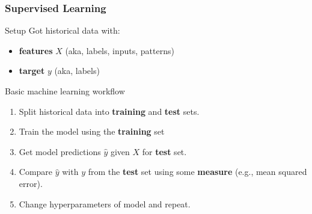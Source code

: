 \documentclass[t]{beamer}
\newcommand\df{\bf\color{Maroon}}
\begin{document}
 \begin{frame}
   \frametitle{Supervised Learning}
   \begin{block}{Setup}
     Got historical data with:
     \begin{itemize}
     \item {\df features}  $X$ (aka, labels, inputs, patterns)
     \item {\df target} $y$ (aka, labels)\pause
     \end{itemize}
   \end{block}
   \begin{block}{Basic machine learning workflow}
     \begin{enumerate}
     \item Split historical data into {\df training} and {\df test} sets.\pause
     \item Train the model using the {\df training} set\pause
     \item Get model predictions $\hat y$ given $X$ for {\df test} set.\pause
     \item Compare $\hat y$ with $y$ from the {\df test} set using some {\df measure} (e.g.,
       mean squared error).\pause
     \item Change hyperparameters of model and repeat.
     \end{enumerate}
   \end{block}
 \end{frame}
\end{document}
